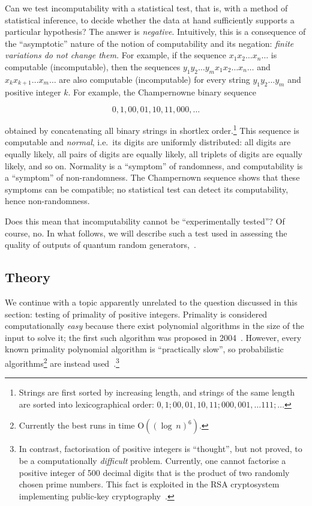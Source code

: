 \documentclass[l1pt]{elsarticle}
\begin{document}
Can we test incomputability with a statistical test, that is, with a method of statistical inference, to decide whether the data at hand sufficiently supports a particular hypothesis? The answer is {\it negative}. Intuitively, this is a consequence of the ``asymptotic'' nature of the notion of computability and its negation: {\it  finite variations do not change them.}  For example, if the sequence $x_1x_2 \dots x_n \dots$ is  computable (incomputable), then the sequences $y_1y_2\dots y_m x_1x_2 \dots x_n \dots$ and $x_kx_{k+1} \dots x_m \dots$
are also computable (incomputable) for every string $y_1y_2\dots y_m$ and positive integer $k$. For example, the Champernowne binary sequence~\cite{DGC1933}

\[0,1,00,01,10,11,000, \dots \]



\noindent obtained by concatenating all binary strings in shortlex order.\footnote{Strings are first sorted by increasing length,  and  strings of the same length are sorted into lexicographical order:
$0,1; 00,01,10,11; 000, 001, \dots 111; \dots$} This sequence is computable and  {\it normal},
i.e.~its digits are uniformly distributed: all digits are equally likely, all pairs of digits are equally likely, all triplets of digits are equally likely, and so on. Normality is a ``symptom'' of randomness, and computability is a  ``symptom'' of non-randomness. The Champernown sequence shows that these symptoms can be compatible; no statistical test can detect its computability, hence non-randomness.

Does this mean that incomputability cannot be ``experimentally tested''? Of course, no. In what follows, we will describe such a test used in assessing the quality of outputs of quantum random generators,~\cite{DBLP:journals/corr/abs-1004-1521,abbott2018experimentally}.



\subsection{Theory}

We continue with a topic apparently unrelated to the question discussed in this section: testing of primality of positive integers. Primality is considered computationally {\it easy} because there exist polynomial algorithms in the size of the input to solve it;  the first such algorithm was proposed in 2004~\cite{primeP}. However, every known primality polynomial algorithm is ``practically slow'', so probabilistic algorithms\footnote{Currently the best runs in time O$((\log \ n)^6)$.} are instead used~\cite{Stiglic2011}.\footnote{In contrast, factorisation of positive integers is ``thought'', but not proved,  to be a computationally {\it difficult} problem. Currently, one cannot factorise a positive integer of 500 decimal digits that is the product of two randomly chosen prime numbers. This fact is exploited in the RSA cryptosystem implementing public-key cryptography~\cite{Riesel2012}.}
\end{document}
